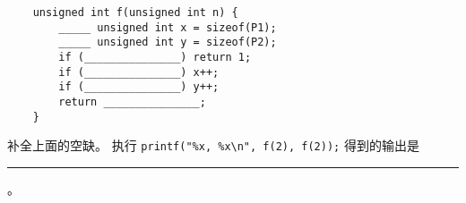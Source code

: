 \begin{problems}
\begin{verbatim}
    unsigned int f(unsigned int n) {
        _____ unsigned int x = sizeof(P1);
        _____ unsigned int y = sizeof(P2);
        if (_______________) return 1;
        if (_______________) x++;
        if (_______________) y++;
        return _______________;
    }
        \end{verbatim}
        \qn 补全上面的空缺。
        \qn 执行 \verb|printf("%x, %x\n", f(2), f(2));| 得到的输出是 \rule{2.5cm}{0.25mm}。
    \end{problems}